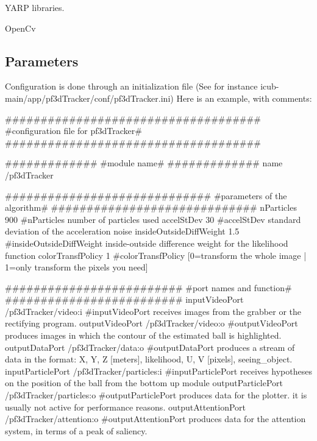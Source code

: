 \begin{DoxyItemize}
\item Y\+A\+RP libraries.
\item Open\+Cv
\end{DoxyItemize}\hypertarget{group__src__demoYoga_parameters_sec}{}\subsection{Parameters}\label{group__src__demoYoga_parameters_sec}
Configuration is done through an initialization file (See for instance icub-\/main/app/pf3d\+Tracker/conf/pf3d\+Tracker.\+ini) Here is an example, with comments\+: 
\begin{DoxyCode}
\textcolor{preprocessor}{####################################}
\textcolor{preprocessor}{#configuration file for pf3dTracker#}
\textcolor{preprocessor}{####################################}


\textcolor{preprocessor}{#############}
\textcolor{preprocessor}{#module name#}
\textcolor{preprocessor}{#############}
name                        /pf3dTracker

\textcolor{preprocessor}{#############################}
\textcolor{preprocessor}{#parameters of the algorithm#}
\textcolor{preprocessor}{#############################}
nParticles                  900
\textcolor{preprocessor}{#nParticles                 number of particles used}
accelStDev                  30
\textcolor{preprocessor}{#accelStDev                 standard deviation of the acceleration noise}
insideOutsideDiffWeight     1.5
#insideOutsideDiffWeight    inside-outside difference weight \textcolor{keywordflow}{for} the likelihood \textcolor{keyword}{function}
colorTransfPolicy           1
\textcolor{preprocessor}{#colorTransfPolicy          [0=transform the whole image | 1=only transform the pixels you need]}


\textcolor{preprocessor}{#########################}
\textcolor{preprocessor}{#port names and function#}
\textcolor{preprocessor}{#########################}
inputVideoPort              /pf3dTracker/video:i
\textcolor{preprocessor}{#inputVideoPort             receives images from the grabber or the rectifying program.}
outputVideoPort             /pf3dTracker/video:o
\textcolor{preprocessor}{#outputVideoPort            produces images in which the contour of the estimated ball is highlighted.}
outputDataPort              /pf3dTracker/data:o
\textcolor{preprocessor}{#outputDataPort             produces a stream of data in the format: X, Y, Z [meters], likelihood, U, V
       [pixels], seeing\_object.}
inputParticlePort           /pf3dTracker/particles:i
\textcolor{preprocessor}{#inputParticlePort          receives hypotheses on the position of the ball from the bottom up module}
outputParticlePort          /pf3dTracker/particles:o
\textcolor{preprocessor}{#outputParticlePort         produces data for the plotter. it is usually not active for performance
       reasons.}
outputAttentionPort         /pf3dTracker/attention:o
\textcolor{preprocessor}{#outputAttentionPort        produces data for the attention system, in terms of a peak of saliency.}



\end{DoxyCode}
